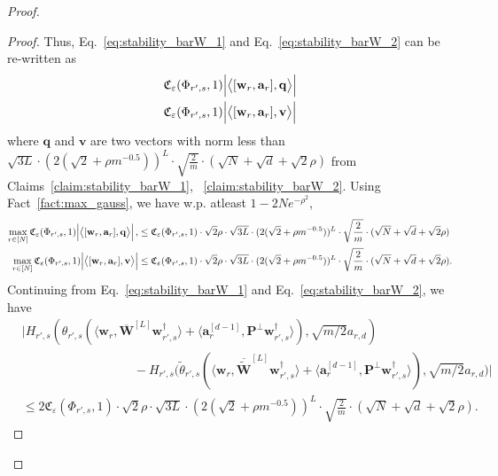 \begin{claim}
\begin{proof}
\begin{proof}
					Thus, Eq.~\ref{eq:stability_barW_1} and Eq.~\ref{eq:stability_barW_2} can be re-written as 
					\begin{align*}
						&\mathfrak{C}_{\varepsilon}(\Phi_{r', s}, 1) 
						\abs{\left\langle [\mathbf{w}_r, \mathbf{a}_r], \mathbf{q}\right\rangle}  \\&
						\mathfrak{C}_{\varepsilon}(\Phi_{r', s}, 1) 
						\abs{\left\langle [\mathbf{w}_r, \mathbf{a}_r], \mathbf{v}\right\rangle}  
					\end{align*}
					where $\mathbf{q}$ and $\mathbf{v}$ are two vectors with norm less than $\sqrt{3L} \cdot (2 (\sqrt{2} + \rho m^{-0.5}))^{L} \cdot \sqrt{\frac{2}{m}} \cdot   (\sqrt{N} + \sqrt{d} + \sqrt{2}\rho)$ from Claims~\ref{claim:stability_barW_1}, ~\ref{claim:stability_barW_2}.
					Using Fact~\ref{fact:max_gauss}, we have w.p. atleast $1 - 2N e^{-\rho^2}$, 
					\begin{align*}
						\max_{r \in [N]} \mathfrak{C}_{\varepsilon}(\Phi_{r', s}, 1) 
						\abs{\left\langle [\mathbf{w}_r, \mathbf{a}_r], \mathbf{q}\right\rangle}, &\le \mathfrak{C}_{\varepsilon}(\Phi_{r', s}, 1)  \cdot \sqrt{2} \rho \cdot \sqrt{3L} \cdot (2 (\sqrt{2} + \rho m^{-0.5}))^{L} \cdot \sqrt{\frac{2}{m}} \cdot   (\sqrt{N} + \sqrt{d} + \sqrt{2}\rho) \\
						\max_{r \in [N]} \mathfrak{C}_{\varepsilon}(\Phi_{r', s}, 1) 
						\abs{\left\langle [\mathbf{w}_r, \mathbf{a}_r], \mathbf{v}\right\rangle} &\le \mathfrak{C}_{\varepsilon}(\Phi_{r', s}, 1)  \cdot \sqrt{2} \rho \cdot \sqrt{3L} \cdot (2 (\sqrt{2} + \rho m^{-0.5}))^{L} \cdot \sqrt{\frac{2}{m}} \cdot   (\sqrt{N} + \sqrt{d} + \sqrt{2}\rho).
					\end{align*}
					Continuing from Eq.~\ref{eq:stability_barW_1} and Eq.~\ref{eq:stability_barW_2}, we have
					\begin{align*}
						&\Big|H_{r', s}\left(\theta_{r', s} \left(\langle \mathbf{w}_{r}, \overline{\mathbf{W}}^{[L]} \mathbf{w}_{r', s}^{\dagger}\rangle + \langle \mathbf{a}_{r}^{[d-1]},  \mathbf{P}^{\perp}\mathbf{w}_{r', s}^{\dagger}  \rangle\right), \sqrt{m/2} a_{r, d}\right) \\&
						\quad\quad\quad\quad\quad\quad\quad\quad\quad- H_{r', s}\big(\widetilde{\theta}_{r', s} (\langle \mathbf{w}_{r}, \overline{\widetilde{\mathbf{W}}}^{[L]} \mathbf{w}_{r', s}^{\dagger}\rangle + \langle \mathbf{a}_{r}^{[d-1]},  \mathbf{P}^{\perp}\mathbf{w}_{r', s}^{\dagger}  \rangle), \sqrt{m/2} a_{r, d}\big)\Big| 
						\\& 
						\le 2\mathfrak{C}_{\varepsilon}(\Phi_{r', s}, 1)  \cdot \sqrt{2} \rho \cdot \sqrt{3L} \cdot (2 (\sqrt{2} + \rho m^{-0.5}))^{L} \cdot \sqrt{\frac{2}{m}} \cdot   (\sqrt{N} + \sqrt{d} + \sqrt{2}\rho).
					\end{align*}
					

\end{proof}
\end{proof}
\end{claim}
